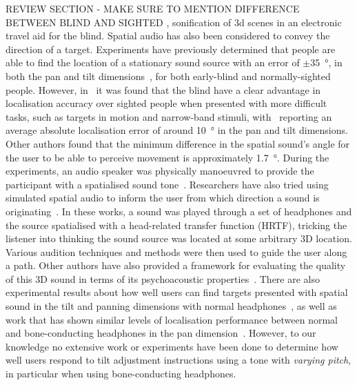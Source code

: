 \documentclass[sigconf, review=true, screen=true, anonymous=true]{acmart}
\begin{document}
REVIEW SECTION - MAKE SURE TO MENTION DIFFERENCE BETWEEN BLIND AND SIGHTED , sonification of 3d scenes in an electronic travel aid for the blind.
Spatial audio has also been considered to convey the direction of a target. Experiments have previously determined that people are able to find the location of a stationary sound source with an error of $\pm$\SI{35}{\degree}, in both the pan and tilt dimensions~\cite{zwiers2001spatial}, for both early-blind and normally-sighted people. However, in~\cite{lewald2013exceptional, lessard1998early} it was found that the blind have a clear advantage in localisation accuracy over sighted people when presented with more difficult tasks, such as targets in motion and narrow-band stimuli, with~\cite{lewald2013exceptional} reporting an average absolute localisation error of around \SI{10}{\degree} in the pan and tilt dimensions. Other authors found that the minimum difference in the spatial sound's angle for the user to be able to perceive movement is approximately \SI{1.7}{\degree}. During the experiments, an audio speaker was physically manoeuvred to provide the participant with a spatialised sound tone~\cite{ashmead1998spatial}. Researchers have also tried using simulated spatial audio to inform the user from which direction a sound is originating~\cite{holland2002audiogps, kammoun2012navigation, rebillat2009smart, menelas2010audio, wilson2007swan, zotkin2004rendering}. In these works, a sound was played through a set of headphones and the source spatialised with a head-related transfer function (HRTF), tricking the listener into thinking the sound source was located at some arbitrary 3D location. Various audition techniques and methods were then used to guide the user along a path. Other authors have also provided a framework for evaluating the quality of this 3D sound in terms of its psychoacoustic properties~\cite{guastavino2004perceptual, nicol2014roadmap}. There are also experimental results about how well users can find targets presented with spatial sound in the tilt and panning dimensions with normal headphones~\cite{katz2011spatial, zwiers2001spatial}, as well as work that has shown similar levels of localisation performance between normal and bone-conducting headphones in the pan dimension~\cite{macdonald2006spatial}. However, to our knowledge no extensive work or experiments have been done to determine how well users respond to tilt adjustment instructions using a tone with \emph{varying pitch}, in particular when using bone-conducting headphones. 
\end{document}
